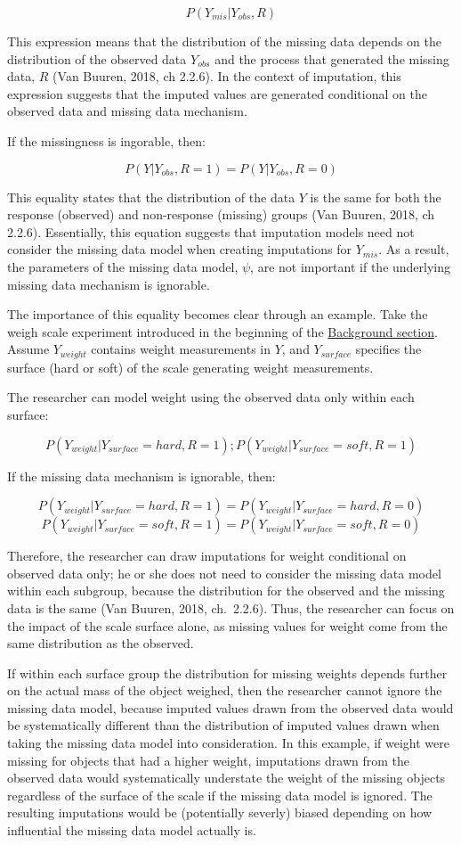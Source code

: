 \documentclass[12pt,oneside]{chicagocapstone}
\begin{document}
\[P(Y_{mis}|Y_{obs}, R)\]

This expression means that the distribution of the missing data depends
on the distribution of the observed data \(Y_{obs}\) and the process
that generated the missing data, \(R\) (Van Buuren, 2018, ch 2.2.6). In
the context of imputation, this expression suggests that the imputed
values are generated conditional on the observed data and missing data
mechanism.

If the missingness is ingorable, then:

\[P(Y|Y_{obs}, R=1) = P(Y|Y_{obs}, R=0)\]

This equality states that the distribution of the data \(Y\) is the same
for both the response (observed) and non-response (missing) groups (Van
Buuren, 2018, ch 2.2.6). Essentially, this equation suggests that
imputation models need not consider the missing data model when creating
imputations for \(Y_{mis}\). As a result, the parameters of the missing
data model, \(\psi\), are not important if the underlying missing data
mechanism is ignorable.

The importance of this equality becomes clear through an example. Take
the weigh scale experiment introduced in the beginning of the
\protect\hyperlink{background}{Background section}. Assume
\(Y_{weight}\) contains weight measurements in \(Y\), and
\(Y_{surface}\) specifies the surface (hard or soft) of the scale
generating weight measurements.

The researcher can model weight using the observed data only within each
surface:

\[P(Y_{weight}|Y_{surface}=hard, R=1) ; P(Y_{weight}|Y_{surface}=soft, R=1)\]

If the missing data mechanism is ignorable, then:

\[P(Y_{weight}|Y_{surface}=hard, R=1) = P(Y_{weight}|Y_{surface}=hard, R=0)\]
\[P(Y_{weight}|Y_{surface}=soft, R=1) = P(Y_{weight}|Y_{surface}=soft, R=0)\]

Therefore, the researcher can draw imputations for weight conditional on
observed data only; he or she does not need to consider the missing data
model within each subgroup, because the distribution for the observed
and the missing data is the same (Van Buuren, 2018, ch.~2.2.6). Thus,
the researcher can focus on the impact of the scale surface alone, as
missing values for weight come from the same distribution as the
observed.

If within each surface group the distribution for missing weights
depends further on the actual mass of the object weighed, then the
researcher cannot ignore the missing data model, because imputed values
drawn from the observed data would be systematically different than the
distribution of imputed values drawn when taking the missing data model
into consideration. In this example, if weight were missing for objects
that had a higher weight, imputations drawn from the observed data would
systematically understate the weight of the missing objects regardless
of the surface of the scale if the missing data model is ignored. The
resulting imputations would be (potentially severly) biased depending on
how influential the missing data model actually is.
\end{document}
